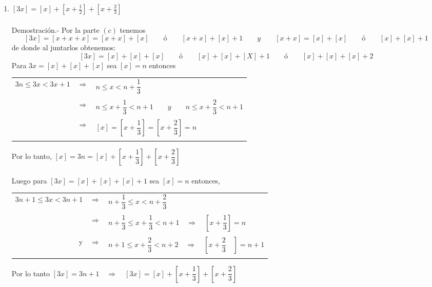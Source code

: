 \begin{enumerate}[ \bfseries 1.]
\begin{enumerate}[\bfseries (a)]
	    \item $[3x] = [x] + [x + \frac{1}{2}] + [x + \frac{2}{3}]$\\\\
		Demostración.-\; Por la parte $(c)$ tenemos $$[3x]=[x+x+x]=[x+x]+[x] \qquad ó \qquad [x+x] + [x] + 1 \qquad y \qquad [x+x]=[x]+[x] \qquad ó \qquad [x]+[x]+1$$   
		de donde al juntarlos obtenemos:
		$$[3x]=[x]+[x]+[x] \qquad ó \qquad [x]+[x]+[X]+1 \qquad ó \qquad [x]+[x]+[x]+2$$ 
		Para $3x=[x]+[x]+[x]$ sea $[x]=n$ entonces
		\begin{center}
		    \begin{tabular}{rcl}
			$3n\leq 3x<3x+1$&$\Longrightarrow$&$n\leq x<n+\dfrac{1}{3}$\\\\
			&$\Longrightarrow$&$n\leq x+\dfrac{1}{3} < n+1 \qquad y \qquad n \leq x+\dfrac{2}{3} < n+1$\\\\
			&$\Longrightarrow$&$[x]=\left[x+\dfrac{1}{3}\right] = \left[x+\dfrac{2}{3}\right] = n$\\\\
		    \end{tabular}
		\end{center}
		Por lo tanto, $[x]=3n=[x]+\left[x+\dfrac{1}{3}\right] + \left[x +\dfrac{2}{3} \right]$\\\\
		Luego para $[3x]=[x]+[x]+[x] + 1$ sea $[x]=n$ entonces,

		\begin{center}
		    \begin{tabular}{rcl}
			$3n+1 \leq 3x < 3n + 1$&$\Longrightarrow$&$n+\dfrac{1}{3} \leq x < n + \dfrac{2}{3}$\\\\
			&$\Longrightarrow$&$n+\dfrac{1}{3} \leq x+\dfrac{1}{3} < n+1 \quad \Rightarrow \quad \left[x + \dfrac{1}{3} \right] = n$\\\\
			y&$\Longrightarrow$&$n+1\leq x + \dfrac{2}{3} < n+2 \quad \Rightarrow \quad \left[x+\dfrac{2}{3}\quad \right]= n+1$\\\\
		    \end{tabular}
		\end{center}
		Por lo tanto $[3x]=3n+1 \quad \Longrightarrow \quad [3x]=[x] + \left[x+\dfrac{1}{3}\right] + \left[x+\dfrac{2}{3}\right]$\\\\


\end{enumerate}
\end{enumerate}
